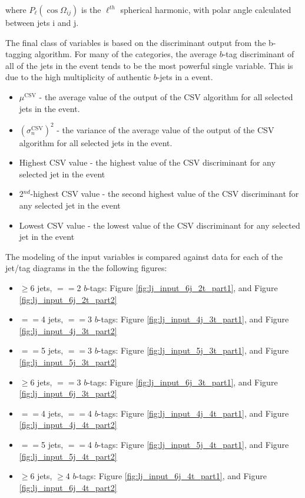 \noindent where $P_{\ell}(\cos{\Omega_{ij}})$ is the $\ell^{th}$
spherical harmonic, with polar angle calculated between jets i and j.  

\par The final class of variables is based on the discriminant output
from the b-tagging algorithm.  For many of the categories, the average
$b$-tag discriminant of all of the jets in the event tends to be the
most powerful single variable.  This is due to the high multiplicity
of authentic $b$-jets in a \ttH event. 

\begin{itemize}
  \item $\mu^{\text{CSV}}$ - the average value of the output of the
    CSV algorithm for all selected jets in the event.  
  \item $(\sigma_n^{\text{CSV}})^2$ - the variance of the average value of the output of the
    CSV algorithm for all selected jets in the event. 
  \item Highest CSV value - the highest value of the CSV discriminant
    for any selected jet in the event 
  \item 2$^{nd}$-highest CSV value - the second highest value of the CSV discriminant
    for any selected jet in the event 
  \item Lowest CSV value - the lowest value of the CSV discriminant
    for any selected jet in the event 
\end{itemize}

\par The modeling of the input variables is compared against data for
each of the jet/tag diagrams in the the following figures: 

\begin{itemize}
  \item $\ge$6 jets,  $==$2 $b$-tags: Figure
    \ref{fig:lj_input_6j_2t_part1}, and Figure \ref{fig:lj_input_6j_2t_part2}
  \item $==$4 jets, $==$3 $b$-tags: Figure
    \ref{fig:lj_input_4j_3t_part1}, and Figure \ref{fig:lj_input_4j_3t_part2}
  \item $==$5 jets, $==$3 $b$-tags: Figure
    \ref{fig:lj_input_5j_3t_part1}, and Figure
    \ref{fig:lj_input_5j_3t_part2}
  \item $\ge$6 jets, $==$3 $b$-tags: Figure
    \ref{fig:lj_input_6j_3t_part1}, and Figure \ref{fig:lj_input_6j_3t_part2}
  \item $==$4 jets, $==$4 $b$-tags: Figure
    \ref{fig:lj_input_4j_4t_part1}, and Figure \ref{fig:lj_input_4j_4t_part2}
  \item $==$5 jets, $==$4 $b$-tags: Figure
    \ref{fig:lj_input_5j_4t_part1}, and Figure \ref{fig:lj_input_5j_4t_part2}
  \item $\ge$6 jets, $\ge$4 $b$-tags: Figure
    \ref{fig:lj_input_6j_4t_part1}, and Figure \ref{fig:lj_input_6j_4t_part2}
\end{itemize}

